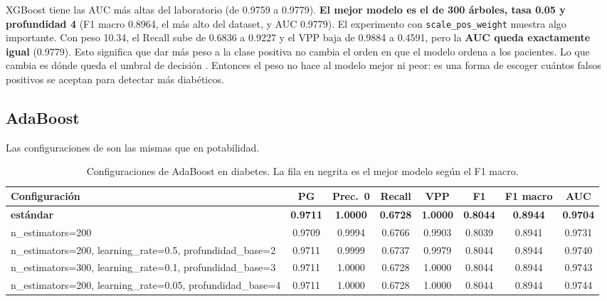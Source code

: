 \documentclass[11pt,a4paper]{article}
\let\citepOriginal\citep
\renewcommand*{\citep}[1]{\textbf{\citepOriginal{#1}}}%
\let\citetOriginal\citet
\renewcommand*{\citet}[1]{\textbf{\citetOriginal{#1}}}%
\begin{document}
XGBoost tiene las AUC más altas del laboratorio (de 0.9759 a 0.9779). \textbf{El mejor modelo es el de 300 árboles, tasa 0.05 y profundidad 4} (F1 macro 0.8964, el más alto del dataset, y AUC 0.9779). El experimento con \texttt{scale\_pos\_weight} muestra algo importante. Con peso 10.34, el Recall sube de 0.6836 a 0.9227 y el VPP baja de 0.9884 a 0.4591, pero la \textbf{AUC queda exactamente igual} (0.9779). Esto significa que dar más peso a la clase positiva no cambia el orden en que el modelo ordena a los pacientes. Lo que cambia es dónde queda el umbral de decisión \citep{fawcett2006,he2009}. Entonces el peso no hace al modelo mejor ni peor: es una forma de escoger cuántos falsos positivos se aceptan para detectar más diabéticos.

\subsection{AdaBoost}
Las configuraciones de \citet{freund1997} son las mismas que en potabilidad.

\begin{table}[H]
\centering
\small
\caption{Configuraciones de AdaBoost en diabetes. La fila en negrita es el mejor modelo según el F1 macro.}
\setlength{\tabcolsep}{4pt}
\begin{tabular}{>{\raggedright\arraybackslash}p{4.9cm}ccccccc}
\toprule
Configuración & PG & Prec.\ 0 & Recall & VPP & F1 & F1 macro & AUC \\
\midrule
\textbf{estándar} & \textbf{0.9711} & \textbf{1.0000} & \textbf{0.6728} & \textbf{1.0000} & \textbf{0.8044} & \textbf{0.8944} & \textbf{0.9704} \\
n\_estimators=\allowbreak{}200 & 0.9709 & 0.9994 & 0.6766 & 0.9903 & 0.8039 & 0.8941 & 0.9731 \\
n\_estimators=\allowbreak{}200, \allowbreak learning\_rate=\allowbreak{}0.5, \allowbreak profundidad\_base=\allowbreak{}2 & 0.9711 & 0.9999 & 0.6737 & 0.9979 & 0.8044 & 0.8944 & 0.9740 \\
n\_estimators=\allowbreak{}300, \allowbreak learning\_rate=\allowbreak{}0.1, \allowbreak profundidad\_base=\allowbreak{}3 & 0.9711 & 1.0000 & 0.6728 & 1.0000 & 0.8044 & 0.8944 & 0.9743 \\
n\_estimators=\allowbreak{}200, \allowbreak learning\_rate=\allowbreak{}0.05, \allowbreak profundidad\_base=\allowbreak{}4 & 0.9711 & 1.0000 & 0.6728 & 1.0000 & 0.8044 & 0.8944 & 0.9744 \\
\bottomrule
\end{tabular}
\end{table}
\end{document}
